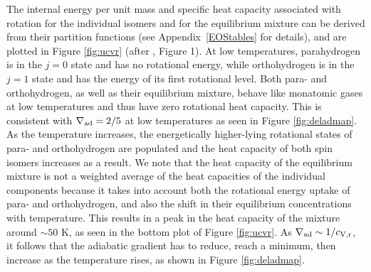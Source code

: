 \documentclass[apj]{emulateapj}
\newcommand{\delad}{\nabla_{\rm ad}}
\newcommand{\App}[1]{Appendix~\ref{#1}}
\begin{document}
The internal energy per unit mass and specific heat capacity associated with rotation for the individual isomers and for the equilibrium mixture can be derived from their partition functions (see \App{EOStables} for details), and are plotted in Figure  \ref{fig:ucvr} (after \citealt{farkas35}, Figure 1). At low temperatures, parahydrogen is in the $j=0$ state and has no rotational energy, while orthohydrogen is in the $j=1$ state and has the energy of its first rotational level. Both para- and orthohydrogen, as well as their equilibrium mixture, behave like monatomic gases at low temperatures and thus have zero rotational heat capacity. This is consistent with $\delad=2/5$ at low temperatures as seen in Figure \ref{fig:deladmap}. As the temperature increases, the energetically higher-lying rotational states of para- and orthohydrogen are populated and the heat capacity of both spin isomers increases as a result. We note that the heat capacity of the equilibrium mixture is not a weighted average of the heat capacities of the individual components because it takes into account both the rotational energy uptake of para- and orthohydrogen, and also the shift in their equilibrium concentrations with temperature. This results in a peak in the heat capacity of the mixture around $\sim$$50$ K, as seen in the bottom plot of Figure \ref{fig:ucvr}. As $\delad \sim 1/c_{\rm{V,r}}$, it follows that the adiabatic gradient has to reduce, reach a minimum, then increase as the temperature rises, as shown in Figure \ref{fig:deladmap}.






\end{document}
